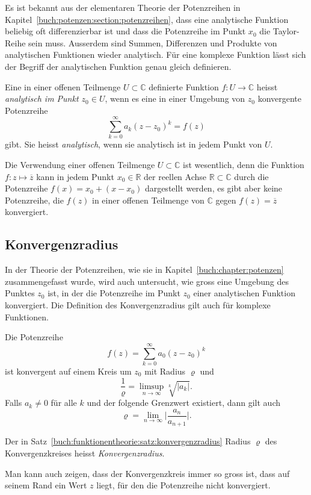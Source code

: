Es ist bekannt aus der elementaren Theorie der Potenzreihen
in Kapitel~\ref{buch:potenzen:section:potenzreihen}, dass
eine analytische Funktion beliebig oft differenzierbar ist und dass
die Potenzreihe im Punkt $x_0$ die Taylor-Reihe sein muss.
Ausserdem sind Summen, Differenzen und Produkte von analytischen Funktionen
wieder analytisch.
Für eine komplexe Funktion lässt sich der Begriff der
analytischen Funktion genau gleich definieren.

\begin{definition}
Eine in einer offenen Teilmenge $U\subset \mathbb{C}$ definierte Funktion
$f\colon U\to\mathbb{C}$ heisst {\em analytisch im Punkt $z_0\in U$}, wenn
es eine in einer Umgebung von $z_0$ konvergente Potenzreihe
\[
\sum_{k=0}^\infty a_k(z-z_0)^k = f(z)
\]
gibt.
Sie heisst {\em analytisch}, wenn sie analytisch ist in jedem Punkt von $U$.
\end{definition}

Die Verwendung einer offenen Teilmenge $U\subset\mathbb{C}$ ist wesentlich,
denn die Funktion $f\colon z\mapsto \overline{z}$ kann in jedem Punkt
$x_0\in\mathbb{R}$
der reellen Achse $\mathbb{R}\subset\mathbb{C}$ durch die Potenzreihe 
$f(x) = x_0 + (x-x_0)$ dargestellt werden,
es gibt aber keine Potenzreihe, die $f(z)$ in einer offenen Teilmenge
von $\mathbb{C}$ gegen $f(z)=\overline{z}$ konvergiert.

%
%
\subsection{Konvergenzradius
\label{buch:funktionentheorie:subsection:konvergenzradius}}
In der Theorie der Potenzreihen, wie sie in Kapitel~\ref{buch:chapter:potenzen}
zusammengefasst wurde, wird auch untersucht, wie gross
eine Umgebung des Punktes $z_0$ ist, in der die Potenzreihe
im Punkt $z_0$ einer analytischen Funktion konvergiert.
Die Definition des Konvergenzradius gilt auch für komplexe Funktionen.

\begin{satz}
%
\label{buch:funktionentheorie:satz:konvergenzradius}
Die Potenzreihe
\[
f(z) = \sum_{k=0}^\infty a_0(z-z_0)^k
\]
ist konvergent auf einem Kreis um $z_0$ mit Radius $\varrho$ und
\[
\frac{1}{\varrho}
=
\limsup_{n\to\infty} \sqrt[k]{|a_k|}.
\]
Falls $a_k\ne 0$ für alle $k$ und der folgende Grenzwert existiert,
dann gilt auch
\[
\varrho = \lim_{n\to\infty} \biggl| \frac{a_n}{a_{n+1}}\biggr|.
\]
\end{satz}

\begin{definition}
\label{buch:funktionentheorie:definition:konvergenzradius}
%
Der in Satz~\ref{buch:funktionentheorie:satz:konvergenzradius}
Radius $\varrho$ des Konvergenzkreises heisst {\em Konvergenzradius}.
\end{definition}

Man kann auch zeigen, dass der Konvergenzkreis immer so gross ist,
dass auf seinem Rand ein Wert $z$ liegt, für den die Potenzreihe nicht
konvergiert.

